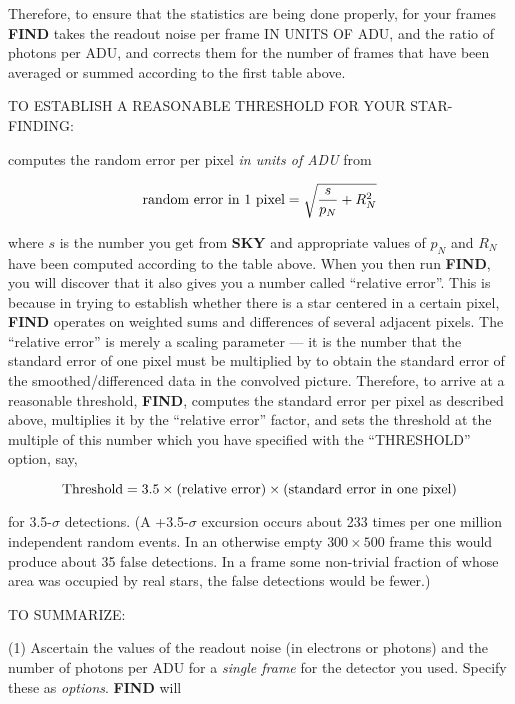 Therefore, to ensure that the statistics are being done properly, for
your frames {\bf FIND} takes the readout noise per frame IN UNITS OF
ADU, and the ratio of photons per ADU, and corrects them for the number
of frames that have been averaged or summed according to the first
table above.

\vfill
\eject
\noindent TO ESTABLISH A REASONABLE THRESHOLD FOR YOUR STAR-FINDING:
\medskip

 computes the random error per pixel {\it in units
of ADU} from

$$
\hbox{\rm random error in 1 pixel} = \sqrt{ {s\over p_N } + R_N^2}
$$

\noindent where $s$ is the number you get from {\bf SKY} and
appropriate values of $p_N$ and $R_N$ have been computed according to
the table above.  When you then run {\bf FIND}, you will discover that
it also gives you a number called ``relative error''.  This is because
in trying to establish whether there is a star centered in a certain
pixel, {\bf FIND} operates on weighted sums and differences of several
adjacent pixels.  The ``relative error'' is merely a scaling parameter
--- it is the number that the standard error of one pixel must be
multiplied by to obtain the standard error of the smoothed/differenced
data in the convolved picture.  Therefore, to arrive at a reasonable
threshold, {\bf FIND}, computes the standard error per pixel as
described above, multiplies it by the ``relative error'' factor, and
sets the threshold at the multiple of this number which you have
specified with the ``THRESHOLD'' option, say,

$$\hbox{\rm Threshold} = 3.5 \times (\hbox{\rm relative error}) 
\times (\hbox{\rm standard error in one pixel}) $$

\noindent for 3.5-$\sigma$ detections.  (A +3.5-$\sigma$ excursion
occurs about 233 times per one million independent random events.  In
an otherwise empty $300 \times  500$ frame this would produce about 35
false detections.  In a frame some non-trivial fraction of whose area
was occupied by real stars, the false detections would be fewer.)

\vfill
\eject
\noindent TO SUMMARIZE:

\item{(1)} Ascertain the values of the readout noise (in electrons or 
photons) and the number of photons per ADU for a {\it single frame} for the 
detector you used.  Specify these as {\it options\/}.  {\bf FIND} will

